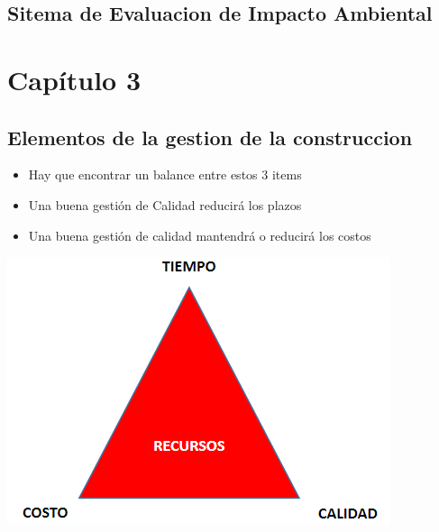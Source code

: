 \documentclass{article} %
\begin{document}
\subsection{Sitema de Evaluacion de Impacto Ambiental}





\newpage 

\section{Capítulo 3}
\subsection{Elementos de la gestion de la construccion}

\begin{minipage}{0.45\textwidth}
    \begin{itemize}
        \item Hay que encontrar un balance entre estos 3 items
        \item Una buena gestión de Calidad reducirá los plazos
        \item Una buena gestión de calidad mantendrá o reducirá los costos
    \end{itemize}
\end{minipage}
\hfill
\begin{minipage}{0.45\textwidth}
    \centering
    \includegraphics[width=\textwidth]{gestion_recursos.png}
\end{minipage}
\end{document}
